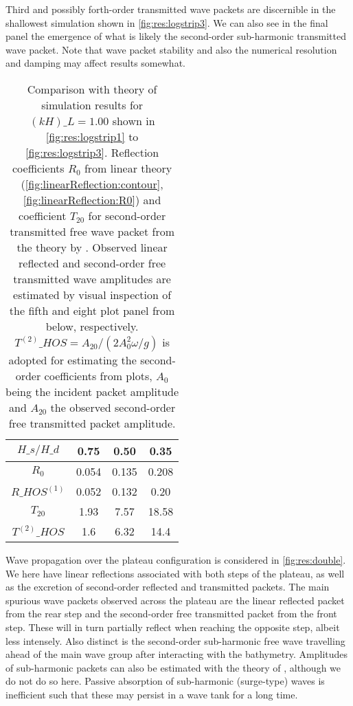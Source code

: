Third and possibly forth-order transmitted wave packets are discernible in the shallowest simulation shown in \autoref{fig:res:logstrip3}.
We can also see in the final panel the emergence of what is likely the second-order sub-harmonic transmitted wave packet. 
Note that wave packet stability and also the numerical resolution and damping may affect results somewhat. 
\\


\begin{table}[H]%
\centering
\begin{tabular}{c|ccc}
$H\_s/H\_d$ & 0.75 & 0.50 & 0.35\\\hline
$R_0$ & 0.054 & 0.135 & 0.208 \\
$R\_{HOS}^{(1)}$ &  0.052 & 0.132 & 0.20\\\hline
$T_{20}$ & 1.93 & 7.57& 18.58 \\
$T^{(2)}\_{HOS}$ & 1.6 & 6.32 & 14.4
\end{tabular}
\caption{
Comparison with theory of simulation results for $(kH)\_L=1.00$ shown in \autoref{fig:res:logstrip1} to \ref{fig:res:logstrip3}.
Reflection coefficients $R_0$ from linear theory (\autoref{fig:linearReflection:contour}, \ref{fig:linearReflection:R0})
and coefficient $T_{20}$ for second-order transmitted free wave packet from the theory by \citet{li_2021_step1}.
Observed linear reflected and second-order free transmitted wave amplitudes are estimated by visual inspection of the fifth and eight plot panel from below, respectively.
$T^{(2)}\_{HOS} = A_{20}/(2A_0^2 \omega/g)$ is adopted for estimating the second-order coefficients from plots, $A_0$ being the incident packet amplitude and $A_{20}$ the observed second-order free transmitted packet amplitude. 
}
\label{tab:compareTheory}
\end{table}



Wave propagation over the plateau configuration  is considered in \autoref{fig:res:double}.
We here have linear reflections associated with both steps of the plateau, as well as the excretion of second-order reflected and transmitted packets.
The main spurious wave packets observed across the plateau are the linear reflected packet from the rear step and the second-order free transmitted packet from the front step. 
These will in turn partially reflect when reaching the opposite step, albeit less intensely. 
Also distinct is the second-order sub-harmonic free wave travelling ahead of the main wave group after interacting with the bathymetry. 
Amplitudes of  sub-harmonic packets can also be estimated with the theory of \citet{li_2021_step1}, although we do not do so here. 
Passive absorption of sub-harmonic  (surge-type) waves is inefficient such that these may persist in a wave tank for a long time.

